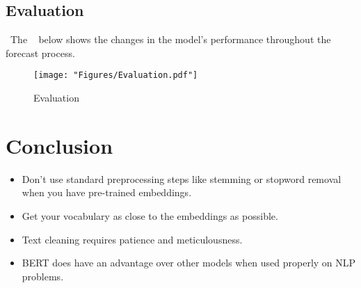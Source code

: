 \subsection{Evaluation}
\
The  ~ below shows the changes 
in the model's performance throughout the forecast process.

\begin{figure}[tbph]
	\centering
	\texttt{[image: "Figures/Evaluation.pdf"]}
	\caption{Evaluation}
	\label{fig:Evaluation}
\end{figure}

\section{Conclusion}

\begin{itemize}
	\item Don't use standard preprocessing steps like stemming or 
	stopword removal when you have pre-trained embeddings.
	\item Get your vocabulary as close to the embeddings as possible.
	\item Text cleaning requires patience and meticulousness. 
	\item BERT does have an advantage over other models when 
	used properly on NLP problems.
\end{itemize}











